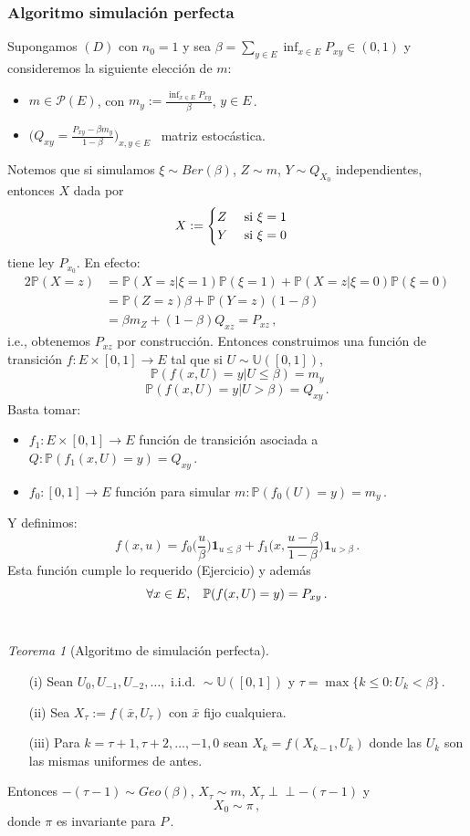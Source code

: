 \documentclass[letterpaper,11pt]{article} %
\def\espacio{\hspace{.25cm}\,}
\theoremstyle{defbreak}
\theoremstyle{propbreak}
\theoremstyle{remark}
\theoremstyle{break}
\newtheorem{theorem}{Teorema}[subsection]
\def\P{\mathbb{P}}
\def\unif{\mathbb{U}([0,1])}
\newcommand{\indep}{\perp \!\!\! \perp}
\def\ejercicio{\color{blue}Ejercicio\color{black}}
\def\iid{\mbox{ i.i.d. }}
\def\beforeitemize{\leavevmode \vspace{-0.5\baselineskip}}
\begin{document}
\subsubsection{Algoritmo simulación perfecta}
Supongamos $(D)$ con $n_0=1$ y sea $\beta=\displaystyle\sum_{y\in E}\inf_{x\in E}P_{xy}\in(0,1)$ y consideremos la siguiente elección de $m$:
\begin{itemize}
    \item $m\in\mathcal{P}(E)$, con $m_y:=\displaystyle\frac{\inf_{x\in E}P_{xy}}{\beta}$, $y\in E$\,.
    \item $\bigg(Q_{xy}=\displaystyle\frac{P_{xy}-\beta m_y}{1-\beta}\bigg)_{x,y\in E}$ \, matriz estocástica.
\end{itemize}
Notemos que si simulamos $\xi\sim Ber(\beta)$, $Z\sim m$, $Y\sim Q_{X_0}$ independientes, entonces $X$ dada por 
$$ X:=\begin{cases}
Z
& \mbox{ si }\xi=1\\
Y & \mbox{ si }\xi=0
\end{cases}\espacio $$
 tiene ley $P_{x_0}$. En efecto:
\begin{alignat*}{2}
    \P(X=z) & = \P(X=z|\xi=1)\P(\xi=1)+\P(X=z|\xi=0)\P(\xi=0) \\
     & = \P(Z=z)\beta + \P(Y=z)(1-\beta)\\
     & = \beta m_Z+(1-\beta)Q_{xz} = P_{xz}\,,
\end{alignat*}
i.e., obtenemos $P_{xz}$ por construcción.
\newp Entonces construimos una función de transición $f:E\times [0,1]\to E$ tal que si $U\sim\unif$,
$$ \P(f(x,U)=y|U\leq \beta)=m_y$$
$$ \P(f(x,U)=y|U>\beta)=Q_{xy}\,.$$
Basta tomar:
\begin{itemize}
    \item $f_1:E\times[0,1]\to E$ función de transición asociada a $Q:\P(f_1(x,U)=y)=Q_{xy}$\,.
    \item $f_0:[0,1]\to E$ función para simular $m:\P(f_0(U)=y)=m_y$\,.
\end{itemize}
Y definimos: 
$$f(x,u)=f_0\bigg(\frac{u}{\beta}\bigg)\mathbf{1}_{u\leq\beta}+f_1\bigg(x,\frac{u-\beta}{1-\beta}\bigg)\mathbf{1}_{u>\beta}\, .$$
Esta función cumple lo requerido (\ejercicio) y además 
$$\forall x\in E,\espacio \P(f(x,U)=y)=P_{xy}\,.$$
\vspace{1.5cm}\\
\begin{theorem}[Algoritmo de simulación perfecta]
\beforeitemize
\begin{enumerate}
    \item[(i)] Sean $U_0,U_{-1},U_{-2},\dots,\iid\sim\unif$ y $\tau=\max\{k\leq 0:U_k<\beta\}$\,.
    \item[(ii)] Sea $X_\tau:=f(\bar{x},U_\tau)$ con $\bar{x}$ fijo cualquiera.
    \item[(iii)] Para $k=\tau+1,\tau+2,\dots,-1,0$ sean $X_k=f(X_{k-1},U_k)$ donde las $U_k$ son las mismas uniformes de antes.  %
\end{enumerate}
Entonces $-(\tau-1)\sim Geo(\beta)$, $X_\tau\sim m$, $X_\tau\indep-(\tau-1)$ y  %
$$ X_0\sim\pi\,,$$
donde $\pi$ es invariante para $P$\,.
\end{theorem}
\end{document}
